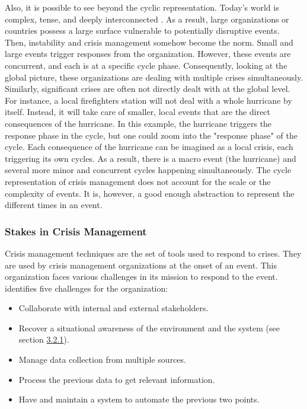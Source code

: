 Also, it is possible to see beyond the cyclic representation.
Today's world is complex, tense, and deeply interconnected \parencite{benabenInstabilityNormPhysicsbased2021}.
As a result, large organizations or countries possess a large surface vulnerable to potentially disruptive events.
Then, instability and crisis management somehow become the norm.
Small and large events trigger responses from the organization.
However, these events are concurrent, and each is at a specific cycle phase.
Consequently, looking at the global picture, these organizations are dealing with multiple crises simultaneously.
Similarly, significant crises are often not directly dealt with at the global level.
For instance, a local firefighters station will not deal with a whole hurricane by itself.
Instead, it will take care of smaller, local events that are the direct consequences of the hurricane.
In this example, the hurricane triggers the response phase in the cycle, but one could zoom into the "response phase" of the cycle.
Each consequence of the hurricane can be imagined as a local crisis, each triggering its own cycles.
As a result, there is a macro event (the hurricane) and several more minor and concurrent cycles happening simultaneously.
The cycle representation of crisis management does not account for the scale or the complexity of events.
It is, however, a good enough abstraction to represent the different times in an event.

\subsubsection{Stakes in Crisis Management}
Crisis management techniques are the set of tools used to respond to crises.
They are used by crisis management organizations at the onset of an event.
This organization faces various challenges in its mission to respond to the event.
\textcite[12--18]{fertierInterpretationAutomatiqueDonnees2018} identifies five challenges for the organization:

\begin{itemize}
    \item Collaborate with internal and external stakeholders.
    \item Recover a situational awareness of the environment and the system (see section \hyperref[sec:situational-awareness]{3.2.1}).
    \item Manage data collection from multiple sources.
    \item Process the previous data to get relevant information.
    \item Have and maintain a system to automate the previous two points.
\end{itemize}

